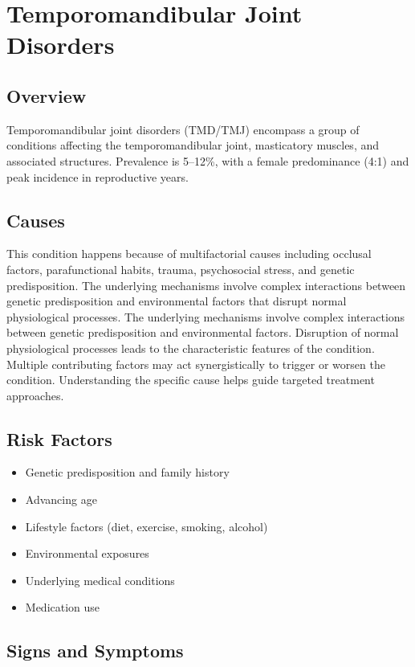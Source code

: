 \chapter{Temporomandibular Joint Disorders}
\label{sec:Temporomandibular Joint Disorders}

\section{Overview}
Temporomandibular joint disorders (TMD/TMJ) encompass a group of conditions affecting the temporomandibular joint, masticatory muscles, and associated structures. Prevalence is 5--12\%, with a female predominance (4:1) and peak incidence in reproductive years.
\section{Causes}
This condition happens because of multifactorial causes including occlusal factors, parafunctional habits, trauma, psychosocial stress, and genetic predisposition. The underlying mechanisms involve complex interactions between genetic predisposition and environmental factors that disrupt normal physiological processes. The underlying mechanisms involve complex interactions between genetic predisposition and environmental factors. Disruption of normal physiological processes leads to the characteristic features of the condition. Multiple contributing factors may act synergistically to trigger or worsen the condition. Understanding the specific cause helps guide targeted treatment approaches.
\section{Risk Factors}


\begin{itemize}[noitemsep]
  \item Genetic predisposition and family history
  \item Advancing age
  \item Lifestyle factors (diet, exercise, smoking, alcohol)
  \item Environmental exposures
  \item Underlying medical conditions
  \item Medication use
\end{itemize}
\section{Signs and Symptoms}

